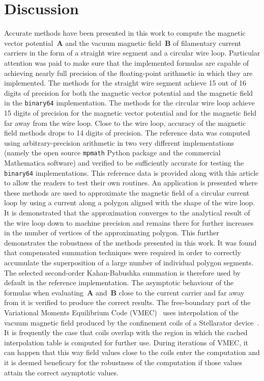 \section{Discussion}
\label{sec:discussion}
Accurate methods have been presented in this work
to compute the magnetic vector potential~$\mathbf{A}$
and the vacuum magnetic field~$\mathbf{B}$
of filamentary current carriers
in the form of a straight wire segment
and a circular wire loop.
Particular attention was paid to make sure that the implemented formulas
are capable of achieving nearly full precision of the floating-point arithmetic
in which they are implemented.
%
The methods for the straight wire segment
achieve 15 out of 16 digits of precision for both
the magnetic vector potential and the magnetic field
in the \texttt{binary64} implementation.
%
The methods for the circular wire loop
achieve 15 digits of precision for the magnetic vector potential
and for the magnetic field far away from the wire loop.
Close to the wire loop, accuracy of the magnetic field methods
drops to 14 digits of precision.
%
The reference data was computed using arbitrary-precision arithmetic
in two very different implementations (namely the open source \texttt{mpmath} Python package
and the commercial Mathematica software) and verified to be sufficiently accurate
for testing the \texttt{binary64} implementations.
This reference data is provided along with this article
to allow the readers to test their own routines.
%
An application is presented where these methods
are used to approximate the magnetic field of a circular current loop
by using a current along a polygon aligned with the shape of the wire loop.
It is demonstrated that the approximation converges to the analytical result
of the wire loop down to machine precision and remains there
for further increases in the number of vertices of the approximating polygon.
This further demonstrates the robustness of the methods presented in this work.
It was found that compensated summation techniques were required
in order to correctly accumulate the superposition of a large number
of individual polygon segments.
The selected second-order Kahan-Babushka summation is therefore used by default in the reference implementation.
%
The asymptotic behaviour of the formulas
when evaluating~$\mathbf{A}$ and~$\mathbf{B}$ close to the current carrier
and far away from it is verified to produce the correct results.
%
The free-boundary part of the Variational Moments Equilibrium Code (VMEC)~\cite{hirshman_1986}
uses interpolation of the vacuum magnetic field produced by the confinement coils
of a Stellarator device~\cite{spitzer_1958}.
It is frequently the case that coils overlap with the region
in which the cached interpolation table is computed for further use.
During iterations of VMEC, it can happen that this way
field values close to the coils enter the computation
and it is deemed beneficary for the robustness of the computation
if those values attain the correct asymptotic values.
